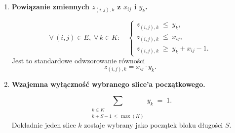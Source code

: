 \documentclass[12pt]{article}
\begin{document}
\begin{enumerate}
	      \vspace{1em}

	\item \textbf{Powiązanie zmiennych \(z_{(i,j),k}\) z \(x_{ij}\) i \(y_k\).}

	      \[
		      \forall\,(i,j)\in E,\;\forall\,k \in K:\quad
		      \begin{cases}
			      z_{(i,j),k} \;\le\; y_k,    \\
			      z_{(i,j),k} \;\le\; x_{ij}, \\
			      z_{(i,j),k} \;\ge\; y_k + x_{ij} - 1.
		      \end{cases}
	      \]
	      Jest to standardowe odwzorowanie równości
	      \[
		      z_{(i,j),k} = x_{ij} \cdot y_k.
	      \]

	      \vspace{1em}

	\item \textbf{Wzajemna wyłączność wybranego slice'a początkowego.}

	      \[
		      \sum_{\substack{k \in K \\ k + S - 1 \,\le\, \max(K)}}
		      y_k
		      \;=\; 1.
	      \]
	      Dokładnie jeden slice \(k\) zostaje wybrany jako początek bloku długości \(S\).

\end{enumerate}
\end{document}
